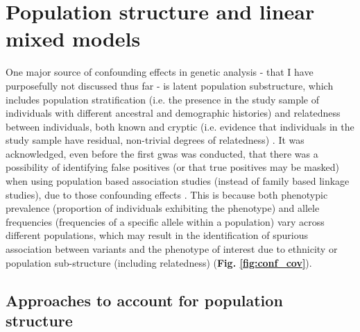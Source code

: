 \newpage


\section{Population structure and linear mixed models}
\label{sec:linear_mixed_models}

One major source of confounding effects in genetic analysis - that I have purposefully not discussed thus far -  is latent population substructure, which includes population stratification (i.e. the presence in the study sample of individuals with different ancestral and demographic histories) and relatedness between individuals, both known and cryptic (i.e. evidence that individuals in the study sample have residual, non-trivial degrees of relatedness) \cite{mccarthy2008genome}.
It was acknowledged, even before the first \gls{gwas} was conducted, that there was a possibility of identifying false positives (or that true positives may be masked) when using population based association studies (instead of family based linkage studies), due to those confounding effects \cite{burton2005key}. 
This is because both phenotypic prevalence (proportion of individuals exhibiting the phenotype) and allele frequencies (frequencies of a specific allele within a population) vary across different populations, which may result in the identification of spurious association between variants and the phenotype of interest due to ethnicity or population sub-structure (including relatedness) \cite{burton2005key} (\textbf{Fig. \ref{fig:conf_cov}}).


\subsection{Approaches to account for population structure}
\label{sec:pop_struct_noLMM}

